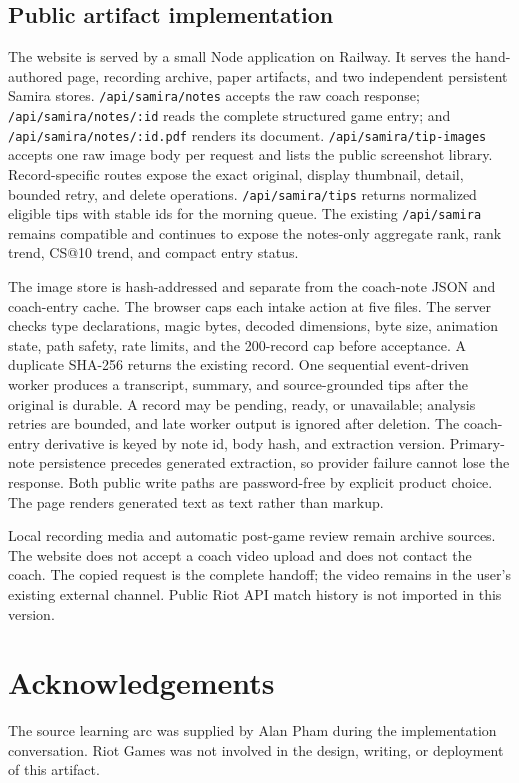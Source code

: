 \documentclass[12pt,letterpaper]{article}
\newcommand{\backmattersection}[1]{\section*{#1}\markboth{#1}{}}
\begin{document}
\subsection*{Public artifact implementation}

The website is served by a small Node application on Railway. It serves the hand-authored page, recording archive, paper artifacts, and two independent persistent Samira stores. \texttt{/api/samira/notes} accepts the raw coach response; \texttt{/api/samira/notes/:id} reads the complete structured game entry; and \texttt{/api/samira/notes/:id.pdf} renders its document. \texttt{/api/samira/tip-images} accepts one raw image body per request and lists the public screenshot library. Record-specific routes expose the exact original, display thumbnail, detail, bounded retry, and delete operations. \texttt{/api/samira/tips} returns normalized eligible tips with stable ids for the morning queue. The existing \texttt{/api/samira} remains compatible and continues to expose the notes-only aggregate rank, rank trend, CS@10 trend, and compact entry status.

The image store is hash-addressed and separate from the coach-note JSON and coach-entry cache. The browser caps each intake action at five files. The server checks type declarations, magic bytes, decoded dimensions, byte size, animation state, path safety, rate limits, and the 200-record cap before acceptance. A duplicate SHA-256 returns the existing record. One sequential event-driven worker produces a transcript, summary, and source-grounded tips after the original is durable. A record may be pending, ready, or unavailable; analysis retries are bounded, and late worker output is ignored after deletion. The coach-entry derivative is keyed by note id, body hash, and extraction version. Primary-note persistence precedes generated extraction, so provider failure cannot lose the response. Both public write paths are password-free by explicit product choice. The page renders generated text as text rather than markup.

Local recording media and automatic post-game review remain archive sources. The website does not accept a coach video upload and does not contact the coach. The copied request is the complete handoff; the video remains in the user's existing external channel. Public Riot API match history is not imported in this version.

\backmattersection{Acknowledgements}

The source learning arc was supplied by Alan Pham during the implementation conversation. Riot Games was not involved in the design, writing, or deployment of this artifact.
\end{document}

